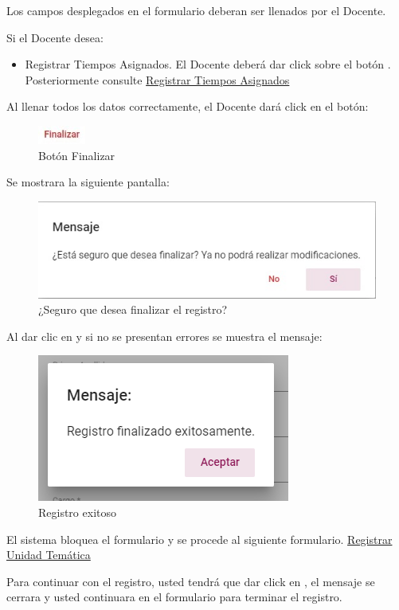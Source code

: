\documentclass[10pt]{book}
\begin{document}
Los campos desplegados en el formulario deberan ser llenados por el Docente.

Si el Docente desea:

\begin{itemize}
    \item Registrar Tiempos Asignados. El Docente deberá dar click sobre el botón . Posteriormente consulte \hyperlink{RegTA}{Registrar Tiempos Asignados}
\end{itemize}

Al llenar todos los datos correctamente, el Docente dará click en el botón:

\begin{figure}[!hbtp]
    \centering
    \includegraphics[width=0.1\linewidth]{images/SP6/BotonFinalizar.jpeg}
    \caption{Botón Finalizar} 
\end{figure}

Se mostrara la siguiente pantalla:

\begin{figure}[!hbtp]
    \centering
    \includegraphics[width=0.1\linewidth]{images/SP6/DeseaRegistro.jpeg}
    \caption{¿Seguro que desea finalizar el registro?} 
\end{figure}

Al dar clic en  y si no se presentan errores se muestra el mensaje:


\begin{figure}[!hbtp]
    \centering
    \includegraphics[width=0.4\linewidth]{images/SP6/MSG5.png}
    \caption{Registro exitoso}
    \label{mensaje5}
\end{figure}


El sistema bloquea el formulario y se procede al siguiente formulario. \hyperlink{RegUT}{Registrar Unidad Temática}


Para continuar con el registro, usted tendrá que  dar click en , el mensaje se cerrara y usted continuara 
en el formulario para terminar el registro.
\end{document}
